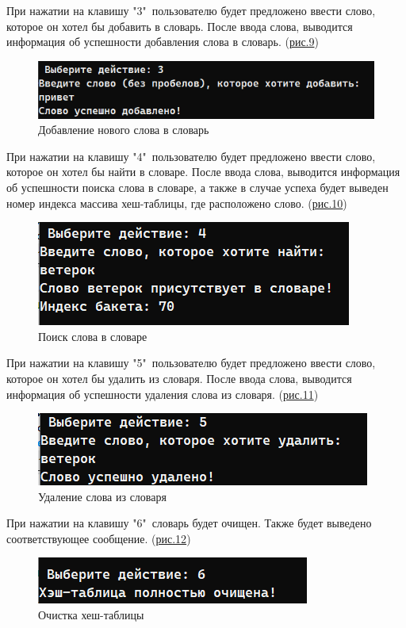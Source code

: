 \documentclass[11pt,a4paper,final]{article} %
\begin{document}
При нажатии на клавишу "3"\ пользователю будет предложено ввести слово, которое он хотел бы добавить в словарь. После ввода слова, выводится информация об успешности добавления слова в словарь. (\hyperref[fig:pic6]{рис.9})
\begin{figure}[H]
	\centering
	\includegraphics[width=0.45\linewidth]{img/pic6.png}
	\caption{Добавление нового слова в словарь}
	\label{fig:pic6}
\end{figure}


При нажатии на клавишу "4"\ пользователю будет предложено ввести слово, которое он хотел бы найти в словаре. После ввода слова, выводится информация об успешности поиска слова в словаре, а также в случае успеха будет выведен номер индекса массива хеш-таблицы, где расположено слово.  (\hyperref[fig:pic7]{рис.10})
\begin{figure}[H]
	\centering
	\includegraphics[width=0.45\linewidth]{img/pic7.png}
	\caption{Поиск слова в словаре}
	\label{fig:pic7}
\end{figure}

При нажатии на клавишу "5"\ пользователю будет предложено ввести слово, которое он хотел бы удалить из словаря. После ввода слова, выводится информация об успешности удаления слова из словаря. (\hyperref[fig:pic8]{рис.11})
\begin{figure}[H]
	\centering
	\includegraphics[width=0.45\linewidth]{img/pic8.png}
	\caption{Удаление слова из словаря}
	\label{fig:pic8}
\end{figure}

При нажатии на клавишу "6"\ словарь будет очищен. Также будет выведено соответствующее сообщение. (\hyperref[fig:pic9]{рис.12})
\begin{figure}[H]
	\centering
	\includegraphics[width=0.45\linewidth]{img/pic9.png}
	\caption{Очистка хеш-таблицы}
	\label{fig:pic9}
\end{figure}
\end{document}

